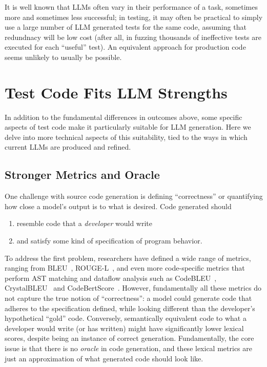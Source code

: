 \documentclass[sigconf,natbib=false]{acmart}
\begin{document}
It is well known that LLMs often vary in their performance of a task,
sometimes more and sometimes less successful; in testing, it may often
be practical to simply use a large number of LLM generated tests for
the same code, assuming that redundnacy will be low cost (after all,
in fuzzing thousands of ineffective tests are executed for each
``useful'' test).  An equivalent approach for production code seems
unlikely to usually be possible.

\section{Test Code Fits LLM Strengths}

In addition to the fundamental differences in outcomes above, some
specific aspects of test code make it particularly suitable for LLM
generation.  Here we delve into more technical aspects of this
suitability, tied to the ways in which current LLMs are produced and refined.

\subsection{Stronger Metrics and Oracle}

One challenge with source code generation is defining ``correctness'' or quantifying 
how close a model's output is to what is desired.  Code generated
should

\begin{enumerate}
\item resemble code that a \emph{developer} would 
  write
\item and satisfy some kind of specification of program behavior.
\end{enumerate}

\noindent  To address the first problem, researchers have defined a wide 
range of metrics, ranging from BLEU~\cite{BLEU}, ROUGE-L~\cite{ROUGE}, and even more code-specific metrics that perform 
AST matching and dataflow analysis such as CodeBLEU~\cite{CodeBLEU}, CrystalBLEU~\cite{CrystalBLEU} and CodeBertScore~\cite{CodeBERTScore}.
However, fundamentally all these metrics do not capture the true notion of ``correctness'': a model could generate code that adheres to the 
specification defined, while looking different than the developer's
hypothetical ``gold'' code. Conversely, semantically equivalent code
to what a developer would write (or has written) might have significantly lower lexical scores, despite being an instance of correct generation. Fundamentally, the core issue is that there 
is no \emph{oracle} in code generation, and these lexical metrics are just an approximation of what generated code should look like.
\end{document}
